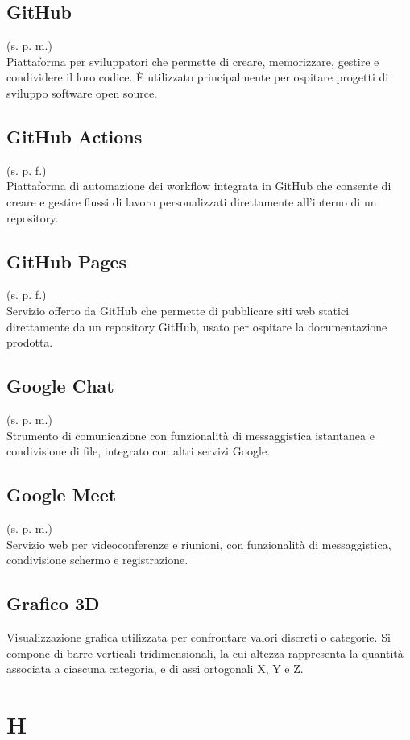     \subsection{GitHub}
    \label{GitHub}
    (s. p. m.)\\
    Piattaforma per sviluppatori che permette di creare, memorizzare, gestire 
    e condividere il loro codice. È utilizzato principalmente per ospitare 
    progetti di sviluppo software open source.
    \subsection{GitHub Actions}
    \label{GitHub Actions}
    (s. p. f.)\\
    Piattaforma di automazione dei workflow integrata in GitHub che consente 
    di creare e gestire flussi di lavoro personalizzati direttamente all'interno 
    di un repository.
    \subsection{GitHub Pages}
    \label{GitHub Pages}
    (s. p. f.)\\
    Servizio offerto da GitHub che permette di pubblicare siti web statici direttamente da un repository GitHub,
    usato per ospitare la documentazione prodotta.
    \subsection{Google Chat}
    (s. p. m.)\\
    Strumento di comunicazione con funzionalità di messaggistica
    istantanea e condivisione di file, integrato con altri servizi Google.
    \subsection{Google Meet}    
    (s. p. m.)\\
    Servizio web per videoconferenze e riunioni, con funzionalità di messaggistica,
    condivisione schermo e registrazione.
    \subsection{Grafico 3D}
    Visualizzazione grafica utilizzata per confrontare valori discreti o categorie. 
    Si compone di barre verticali tridimensionali, la cui altezza rappresenta la 
    quantità associata a ciascuna categoria, e di assi ortogonali X, Y e Z. 
\pagebreak
\section{H}
